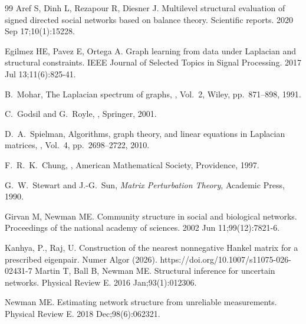 \documentclass[11pt]{article}
\begin{document}
	
	\begin{thebibliography}{99}
         Aref S, Dinh L, Rezapour R, Diesner J. Multilevel structural evaluation of signed directed social networks based on balance theory. Scientific reports. 2020 Sep 17;10(1):15228.
        
 Egilmez HE, Pavez E, Ortega A. Graph learning from data under Laplacian and structural constraints. IEEE Journal of Selected Topics in Signal Processing. 2017 Jul 13;11(6):825-41.
        
		B.~Mohar,
		\newblock The Laplacian spectrum of graphs,
		, 
		Vol.~2, Wiley, pp.~871--898, 1991.

		C.~Godsil and G.~Royle,
		,
		\newblock Springer, 2001.
        
		D.~A.~Spielman,
		\newblock Algorithms, graph theory, and linear equations in Laplacian matrices,
		, 
		Vol.~4, pp.~2698--2722, 2010.

		F.~R.~K.~Chung,
		,
		\newblock American Mathematical Society, Providence, 1997.
        
		G.~W.~Stewart and J.-G.~Sun,
		\newblock \emph{Matrix Perturbation Theory},
		\newblock Academic Press, 1990.

         Girvan M, Newman ME. Community structure in social and biological networks. Proceedings of the national academy of sciences. 2002 Jun 11;99(12):7821-6.

         Kanhya, P., Raj, U. Construction of the nearest nonnegative Hankel matrix for a prescribed eigenpair. Numer Algor (2026). https://doi.org/10.1007/s11075-026-02431-7
        Martin T, Ball B, Newman ME. Structural inference for uncertain networks. Physical Review E. 2016 Jan;93(1):012306.

 Newman ME. Estimating network structure from unreliable measurements. Physical Review E. 2018 Dec;98(6):062321.


\end{thebibliography}
\end{document}
